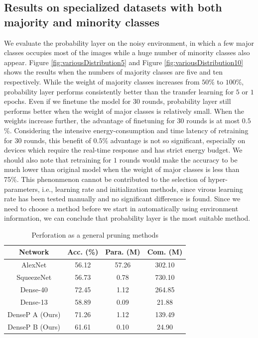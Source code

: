 \documentclass[pageno]{jpaper}
\begin{document}
\subsection{Results on specialized datasets with both majority and minority classes}
We evaluate the probability layer on the noisy environment, in which a few major classes occupies most of the images while a huge number of minority classes also appear. Figure \ref{fig:variousDistribution5} and Figure \ref{fig:variousDistribution10} shows the results when the numbers of majority classes are five and ten respectively. While the weight of majority classes increases from $50$\% to $100$\%, probability layer performs consistently better than the transfer learning for $5$ or $1$ epochs. Even if we finetune the model for $30$ rounds, probability layer still performs better when the weight of major classes is relatively small. When the weights increase further, the advantage of finetuning for $30$ rounds is at most $0.5$\%. Considering the intensive energy-consumption and time latency of retraining for $30$ rounds, this benefit of $0.5$\% advantage is not so significant, especially on devices which require the real-time response and has strict energy budget. We should also note that retraining for $1$ rounds would make the accuracy to be much lower than original model when the weight of major classes is less than 75\%. This phenonmenon cannot be contributed to the selection of hyper-parameters, i.e., learning rate and initialization methods, since virous learning rate has been tested manually and no significant difference is found. Since we need to choose a method before we start in automatically using environment information, we can conclude that probability layer is the most suitable method.




\begin{table}
    \caption{Perforation as a general pruning methods}
    \label{tab:generalPrune}

    \centering
    \begin{tabular}{ c|c|cc } 
     \hline
     Network & Acc. (\%) & Para. (M) & Com. (M) \\ 
     \hline
     AlexNet \cite{ahmed2016network, NIPS2012_4824} & 56.12 & 57.26 & 302.10 \\
     SqueezeNet \cite{iandola2016squeezenet} & 56.73 & 0.78 & 730.10 \\
     \hline
     Dense-40 \cite{huang2017densely} & 72.45 & 1.12 & 264.85 \\
     Dense-13 \cite{huang2017densely}& 58.89 & 0.09 & 21.88 \\
     \hline
     DenseP A (Ours)& 71.26 & 1.12 & 139.49 \\
     DenseP B (Ours)& 61.61 & 0.10 & 24.90 \\
     \hline
    \end{tabular}
\end{table}
\end{document}
